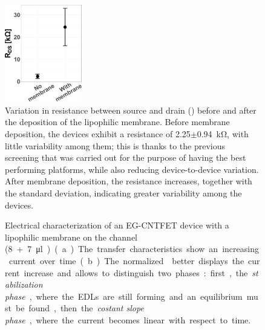 \begin{figure}
    \centering
    \includegraphics[width = 0.3\textwidth]{figures/chapter3/EGFET/Rds_change.png}
    \caption{Variation in resistance between source and drain (\rds{}) before and after the deposition of the lipophilic membrane. Before membrane deposition, the devices exhibit a resistance of \SI{2.25}{}$\pm$\SI{0.94}{\kohm}, with little variability among them; this is thanks to the previous screening that was carried out for the purpose of having the best performing platforms, while also reducing device-to-device variation. After membrane deposition, the resistance increases, together with the standard deviation, indicating greater variability among the devices.}
    \label{fig:rdsChange}
\end{figure}

\begin{figure}
    \centering
    \quad
    \caption{
        Electrical characterization of an EG-CNTFET device with a lipophilic membrane on the channel (\SI{8}+\SI{7}{\micro\l}). 
        (a) The transfer characteristics show an increasing current over time.
        (b) The normalized \ion{} better displays the current increase and allows to distinguish two phases: first, the \emph{stabilization phase}, where the EDLs are still forming and an equilibrium must be found, then the \emph{costant slope phase}, where the current becomes linear with respect to time.}
    \label{fig:Mem}
\end{figure}

